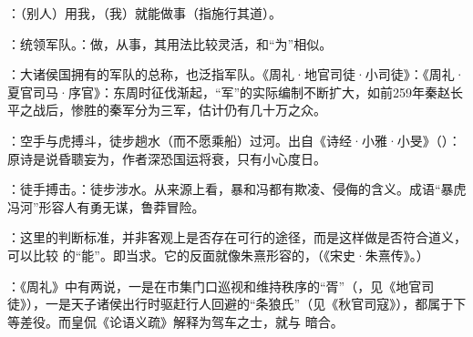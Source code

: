 {
\item {}：（别人）用我，（我）就能做事（指施行其道）。

\item {}：统领军队。：做，从事，其用法比较灵活，和“为”相似。

：大诸侯国拥有的军队的总称，也泛指军队。《周礼·地官司徒·小司徒》：《周礼·夏官司马·序官》：东周时征伐渐起，“军”的实际编制不断扩大，如前259年秦赵长平之战后，惨胜的秦军分为三军，估计仍有几十万之众。 %

\item {}：空手与虎搏斗，徒步趟水（而不愿乘船）过河。出自《诗经·小雅·小旻》（）：原诗是说昏聩妄为，作者深恐国运将衰，只有小心度日。

：徒手搏击。：徒步涉水。从来源上看，暴和冯都有欺凌、侵侮的含义。成语“暴虎冯河”形容人有勇无谋，鲁莽冒险。
}
{}


{
\item {}：这里的判断标准，并非客观上是否存在可行的途径，而是这样做是否符合道义，可以比较  的“能”。即当求。它的反面就像朱熹形容的，（《宋史·朱熹传》。）
\item {}：《周礼》中有两说，一是在市集门口巡视和维持秩序的“胥”（，见《地官司徒》），一是天子诸侯出行时驱赶行人回避的“条狼氏”（见《秋官司寇》），都属于下等差役。而皇侃《论语义疏》解释为驾车之士，就与  暗合。
}
{}


